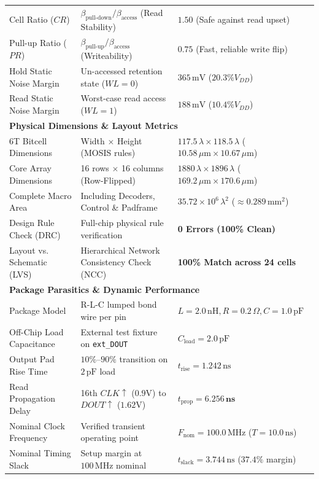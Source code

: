 \documentclass[10pt,a4paper,titlepage]{article}
\begin{document}
\begin{table}[h!]
\begin{tabularx}{\textwidth}{lXl}
Cell Ratio ($CR$) & $\beta_{\text{pull-down}} / \beta_{\text{access}}$ (Read Stability) & $1.50$ (Safe against read upset) \\
Pull-up Ratio ($PR$) & $\beta_{\text{pull-up}} / \beta_{\text{access}}$ (Writeability) & $0.75$ (Fast, reliable write flip) \\
Hold Static Noise Margin & Un-accessed retention state ($WL = 0$) & $365\,\text{mV}$ ($20.3\% V_{DD}$) \\
Read Static Noise Margin & Worst-case read access ($WL = 1$) & $188\,\text{mV}$ ($10.4\% V_{DD}$) \\
\midrule
\multicolumn{3}{l}{\textbf{Physical Dimensions \& Layout Metrics}} \\
6T Bitcell Dimensions & Width $\times$ Height (MOSIS rules) & $117.5\,\lambda \times 118.5\,\lambda$ ($10.58\,\mu\text{m} \times 10.67\,\mu\text{m}$) \\
Core Array Dimensions & 16 rows $\times$ 16 columns (Row-Flipped) & $1880\,\lambda \times 1896\,\lambda$ ($169.2\,\mu\text{m} \times 170.6\,\mu\text{m}$) \\
Complete Macro Area & Including Decoders, Control \& Padframe & $35.72 \times 10^6\,\lambda^2$ ($\approx 0.289\,\text{mm}^2$) \\
Design Rule Check (DRC) & Full-chip physical rule verification & \textbf{0 Errors (100\% Clean)} \\
Layout vs. Schematic (LVS) & Hierarchical Network Consistency Check (NCC) & \textbf{100\% Match across 24 cells} \\
\midrule
\multicolumn{3}{l}{\textbf{Package Parasitics \& Dynamic Performance}} \\
Package Model & R-L-C lumped bond wire per pin & $L = 2.0\,\text{nH}, R = 0.2\,\Omega, C = 1.0\,\text{pF}$ \\
Off-Chip Load Capacitance & External test fixture on \texttt{ext\_DOUT} & $C_{\text{load}} = 2.0\,\text{pF}$ \\
Output Pad Rise Time & $10\%\text{--}90\%$ transition on $2\,\text{pF}$ load & $t_{\text{rise}} = 1.242\,\text{ns}$ \\
Read Propagation Delay & 16th $CLK \uparrow$ ($0.9\text{V}$) to $DOUT \uparrow$ ($1.62\text{V}$) & $t_{\text{prop}} = \mathbf{6.256\,\text{ns}}$ \\
Nominal Clock Frequency & Verified transient operating point & $F_{\text{nom}} = 100.0\,\text{MHz}$ ($T = 10.0\,\text{ns}$) \\
Nominal Timing Slack & Setup margin at $100\,\text{MHz}$ nominal & $t_{\text{slack}} = 3.744\,\text{ns}$ ($37.4\%$ margin) \\

\end{tabularx}
\end{table}
\end{document}
